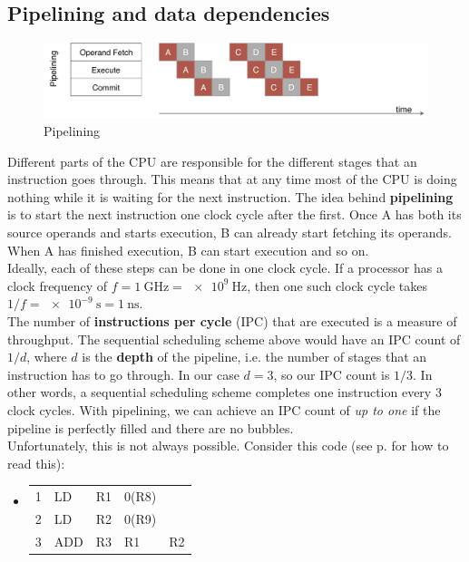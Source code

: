 \documentclass[12pt,a4paper]{article} %
\newenvironment {assembly}{\begingroup \ttfamily \color{Gray} \begin{itemize} \item[]}{\end{itemize}\endgroup}
\begin{document}
\subsection{Pipelining and data dependencies} \label{sec-dependencies}
\begin{figure}[H]
	\centering
	\includegraphics[width=\textwidth]{Source/SchedulingSchemes/Pipelining.pdf}
	\caption{Pipelining} 
	\label{fig-pipelining}
\end{figure}
Different parts of the CPU are responsible for the different stages that an instruction goes through. This means that at any time most of the CPU is doing nothing while it is waiting for the next instruction. The idea behind \textbf{pipelining} is to start the next instruction one clock cycle after the first. Once A has both its source operands and starts execution, B can already start fetching its operands. When A has finished execution, B can start execution and so on. \\
Ideally, each of these steps can be done in one clock cycle. If a processor has a clock frequency of $f=\SI{1}{\GHz} = \SI{e9}{\Hz} $, then one such clock cycle takes $1/f=\SI{e-9}{\second}=\SI{1}{\ns}$.\\ 
The number of \textbf{instructions per cycle} (IPC) that are executed is a measure of throughput. The sequential scheduling scheme above would have an IPC count of $1/d$, where $d$ is the \textbf{depth} of the pipeline, i.e. the number of stages that an instruction has to go through. In our case $d=3$, so our IPC count is $1/3$. In other words, a sequential scheduling scheme completes one instruction every 3 clock cycles. With pipelining, we can achieve an IPC count of \textit{up to one} if the pipeline is perfectly filled and there are no bubbles.\\
Unfortunately, this is not always possible. Consider this code (see p. \pageref{sec-assembly} for how to read this): 
\begin{assembly}
	\begin{tabularx} {\textwidth} {n o a a X}
		1 & LD 	& R1 & 0(R8)	& \\
		2 & LD 	& R2 & 0(R9)	& \\
		3 & ADD & R3 & R1		& R2 \\
	\end{tabularx}
\end{assembly}
\end{document}
